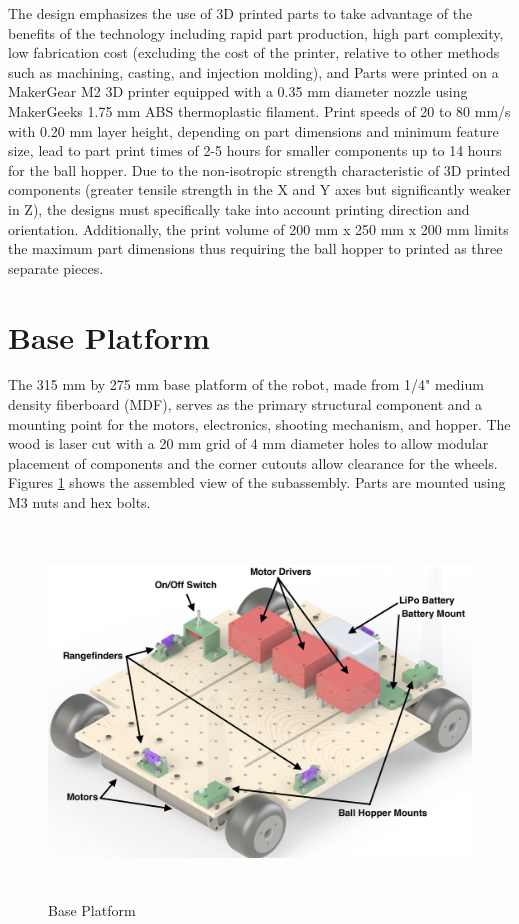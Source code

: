 The design emphasizes the use of 3D printed parts to take advantage of the benefits of the technology including rapid part production, high part complexity, low fabrication cost (excluding the cost of the printer, relative to other methods such as machining, casting, and injection molding), and Parts were printed on a MakerGear M2 3D printer equipped with a 0.35 mm diameter nozzle using MakerGeeks 1.75 mm ABS thermoplastic filament. Print speeds of 20 to 80 mm/s with 0.20 mm layer height, depending on part dimensions and minimum feature size, lead to part print times of 2-5 hours for smaller components up to 14 hours for the ball hopper. Due to the non-isotropic strength characteristic of 3D printed components (greater tensile strength in the X and Y axes but significantly weaker in Z), the designs must specifically take into account printing direction and orientation. Additionally, the print volume of 200 mm x 250 mm x 200 mm limits the maximum part dimensions thus requiring the ball hopper to printed as three separate pieces. 

\section{Base Platform}
The 315 mm by 275 mm base platform of the robot, made from 1/4" medium density fiberboard (MDF), serves as the primary structural component and a mounting point for the motors, electronics, shooting mechanism, and hopper. The wood is laser cut with a 20 mm grid of 4 mm diameter holes to allow modular placement of components and the corner cutouts allow clearance for the wheels. Figures \ref{fig:base_platform} shows the assembled view of the subassembly. Parts are mounted using M3 nuts and hex bolts.

\begin{figure}[H]   %
	\centering \includegraphics[width=6in, height=3.85in, keepaspectratio]{figures/base_platform.png}
	\caption{Base Platform}	\label{fig:base_platform}
\end{figure}

